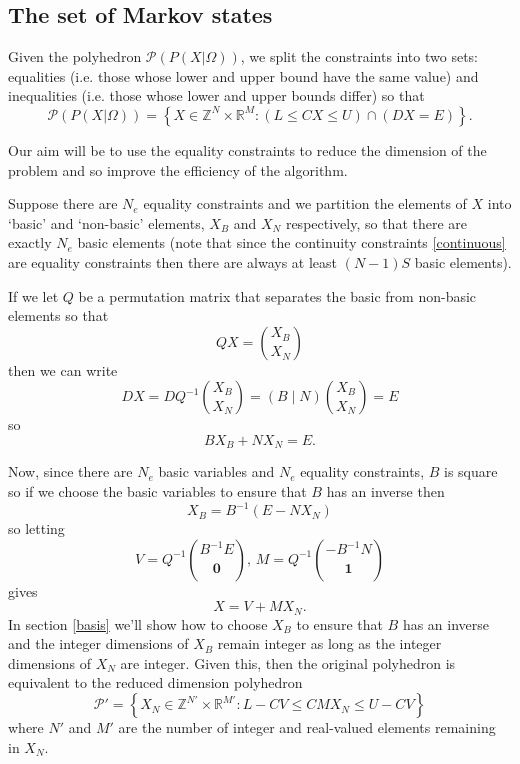 \documentclass{article}
\begin{document}
\subsection{The set of Markov states}

Given the polyhedron $\mathcal{P}(P(X|\Omega))$, we split the constraints into two sets: equalities (i.e. those whose lower and upper bound have the same value) and inequalities (i.e. those whose lower and upper bounds differ) so that
\begin{equation}
\mathcal{P}(P(X|\Omega)) = \left\{X \in \mathbb{Z}^N \times \mathbb{R}^M: \left(L \le CX \le U\right) \cap \left(DX = E\right) \right\}.
\label{zPolySupport}
\end{equation}

Our aim will be to use the equality constraints to reduce the dimension of the problem and so improve the efficiency of the algorithm.

Suppose there are $N_e$ equality constraints and we partition the elements of $X$ into `basic' and `non-basic' elements, $X_B$ and $X_N$ respectively, so that there are exactly $N_e$ basic elements (note that since the continuity constraints \eqref{continuous} are equality constraints then there are always at least $(N-1)S$ basic elements).

If we let $Q$ be a permutation matrix that separates the basic from non-basic elements so that
\[
QX = {X_B \choose X_N}
\]
then we can write
\[
DX = DQ^{-1}{X_B \choose X_N} = \left(B \mid N\right){X_B \choose X_N} = E
\]
so
\begin{equation}
BX_B + NX_N = E.
\label{eqconstraints}
\end{equation}

Now, since there are $N_e$ basic variables and $N_e$ equality constraints, $B$ is square so if we choose the basic variables to ensure that $B$ has an inverse then
\begin{equation}
X_B = B^{-1}(E - NX_N)
\label{basicvars}
\end{equation}
so letting
\[
V = Q^{-1}{B^{-1}E \choose \mathbf{0}}, \, M = Q^{-1}{-B^{-1}N \choose \mathbf{1}}
\]
gives
\begin{equation}
X = V + MX_N.
\label{markovtotrajectory}
\end{equation}
In section \ref{basis} we'll show how to choose $X_B$ to ensure that $B$ has an inverse and the integer dimensions of $X_B$ remain integer as long as the integer dimensions of $X_N$ are integer. Given this, then the original polyhedron is equivalent to the reduced dimension polyhedron
\begin{equation}
\mathcal{P}' = \left\{X_N \in \mathbb{Z}^{N'} \times \mathbb{R}^{M'}: L-CV \le  CMX_N \le U-CV\right\}
\label{reducedPolySupport}
\end{equation}
where $N'$ and $M'$ are the number of integer and real-valued elements remaining in $X_N$.
\end{document}
